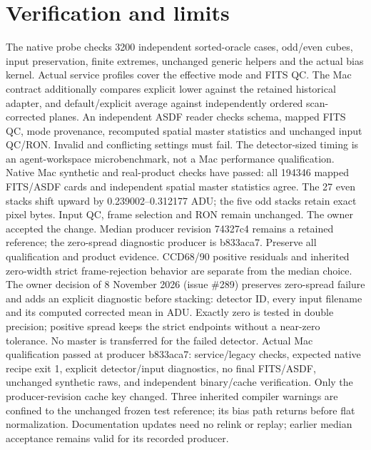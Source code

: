\documentclass[11pt]{article}
\begin{document}
\section{Verification and limits}
The native probe checks 3200 independent sorted-oracle cases, odd/even cubes,
input preservation, finite extremes, unchanged generic helpers and the actual
bias kernel. Actual service profiles cover the effective mode and FITS QC.
The Mac contract additionally compares explicit lower against the retained
historical adapter, and default/explicit average against independently ordered
scan-corrected planes. An independent ASDF reader checks schema, mapped FITS
QC, mode provenance, recomputed spatial master statistics and unchanged input
QC/RON. Invalid and conflicting settings must fail.
The detector-sized timing is an agent-workspace microbenchmark, not a Mac
performance qualification. Native Mac synthetic and real-product checks have passed: all 194346 mapped
FITS/ASDF cards and independent spatial master statistics agree. The 27 even
stacks shift upward by 0.239002--0.312177 ADU; the five odd stacks retain exact
pixel bytes. Input QC, frame selection and RON remain unchanged. The owner
accepted the change. Median producer revision 74327c4 remains a retained
reference; the zero-spread diagnostic producer is b833aca7. Preserve all
qualification and product evidence. CCD68/90 positive residuals and inherited
zero-width strict frame-rejection behavior are separate from the median choice.
The owner decision of 8 November 2026 (issue \#289) preserves zero-spread
failure and adds an explicit diagnostic before stacking: detector ID, every
input filename and its computed corrected mean in ADU. Exactly zero is tested
in double precision; positive spread keeps the strict endpoints without a
near-zero tolerance. No master is transferred for the failed detector.
Actual Mac qualification passed at producer b833aca7: service/legacy checks,
expected native recipe exit 1, explicit detector/input diagnostics, no final
FITS/ASDF, unchanged synthetic raws, and independent binary/cache verification.
Only the producer-revision cache key changed. Three inherited compiler warnings
are confined to the unchanged frozen test reference; its bias path returns
before flat normalization. Documentation updates need no relink or replay;
earlier median acceptance remains valid for its recorded producer.
\end{document}

